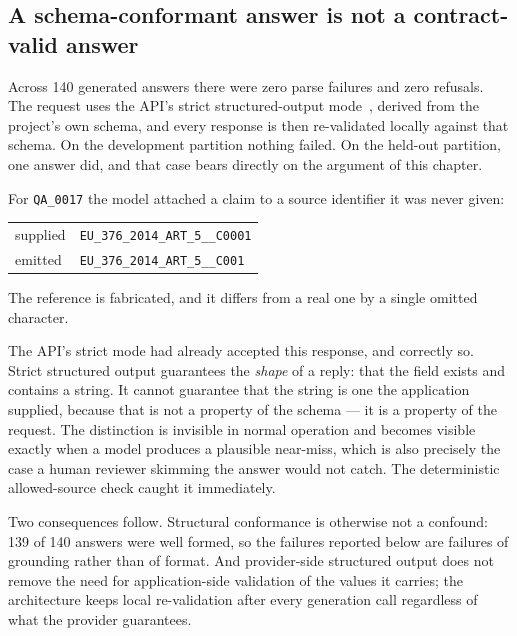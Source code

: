 \subsection{A schema-conformant answer is not a contract-valid answer}
\label{sec:contract-vs-schema}

Across 140 generated answers there were zero parse failures and zero refusals.
The request uses the API's strict structured-output mode~\cite{openai2024structured}, derived from the
project's own schema, and every response is then re-validated locally against
that schema. On the development partition nothing failed. On the held-out partition, one answer did, and that case bears directly on the
argument of this chapter.

For \texttt{QA\_0017} the model attached a claim to a source identifier it was
never given:

\begin{center}
\small
\begin{tabular}{ll}
  supplied & \texttt{EU\_376\_2014\_ART\_5\_\_C0001} \\
  emitted  & \texttt{EU\_376\_2014\_ART\_5\_\_C001} \\
\end{tabular}
\end{center}

\noindent The reference is fabricated, and it differs from a real one by a single
omitted character.

The API's strict mode had already accepted this response, and correctly so.
Strict structured output guarantees the \emph{shape} of a reply: that the field
exists and contains a string. It cannot guarantee that the string is one the
application supplied, because that is not a property of the schema --- it is a
property of the request. The distinction is invisible in normal operation and
becomes visible exactly when a model produces a plausible near-miss, which is
also precisely the case a human reviewer skimming the answer would not catch.
The deterministic allowed-source check caught it immediately.

Two consequences follow. Structural conformance is otherwise not a confound:
139 of 140 answers were well formed, so the failures reported below are failures
of grounding rather than of format. And provider-side structured output does not
remove the need for application-side validation of the values it carries; the
architecture keeps local re-validation after every generation call regardless of
what the provider guarantees.

